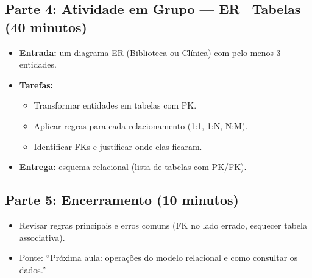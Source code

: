 \documentclass[12pt,a4paper]{article}
\begin{document}
\subsection*{Parte 4: Atividade em Grupo --- ER \textrightarrow\ Tabelas (40 minutos)}
\begin{itemize}[leftmargin=*,itemsep=0.35em]
  \item \textbf{Entrada:} um diagrama ER (Biblioteca ou Clínica) com pelo menos 3 entidades.
  \item \textbf{Tarefas:}
  \begin{itemize}[leftmargin=*,itemsep=0.25em]
    \item Transformar entidades em tabelas com PK.
    \item Aplicar regras para cada relacionamento (1:1, 1:N, N:M).
    \item Identificar FKs e justificar onde elas ficaram.
  \end{itemize}
  \item \textbf{Entrega:} esquema relacional (lista de tabelas com PK/FK).
\end{itemize}

\subsection*{Parte 5: Encerramento (10 minutos)}
\begin{itemize}[leftmargin=*,itemsep=0.35em]
  \item Revisar regras principais e erros comuns (FK no lado errado, esquecer tabela associativa).
  \item Ponte: ``Próxima aula: operações do modelo relacional e como consultar os dados.''
\end{itemize}
\end{document}
